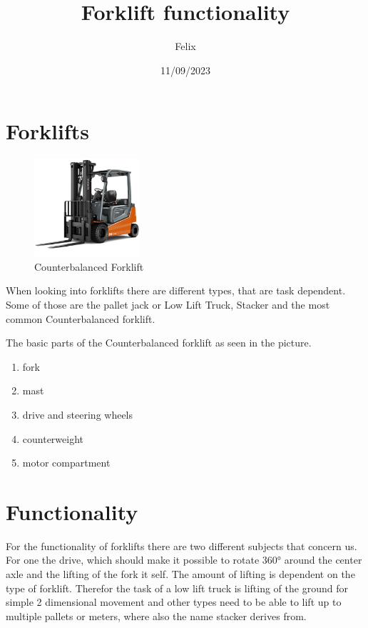 \documentclass[11pt]{article}
\title{Forklift functionality}
\date{11/09/2023}
\author{Felix}
\begin{document}
\maketitle
\section{Forklifts}

\begin{figure}
    \includegraphics[width=0.35\textwidth]{../image/baltic.toyota-forklifts.jpeg}
    \caption{Counterbalanced Forklift}
    \label{fig:forklift}
\end{figure}
When looking into forklifts there are different types, that are task dependent.
Some of those are the pallet jack or Low Lift Truck, Stacker and the most common Counterbalanced forklift.

The basic parts of the Counterbalanced forklift as seen in the picture.
\begin{center}
    \begin{enumerate}
    \item fork
    \item mast
    \item drive and steering wheels 
    \item counterweight
    \item motor compartment
    \end{enumerate}
\end{center}

\section{Functionality}
For the functionality of forklifts there are two different subjects that concern us.
For one the drive, which should make it possible to rotate 360° around the center axle
and the lifting of the fork it self.
The amount of lifting is dependent on the type of forklift. Therefor the task of a low lift 
truck is lifting of the ground for simple 2 dimensional movement and other types need
to be able to lift up to multiple pallets or meters, where also the name stacker derives from.
\end{document}
